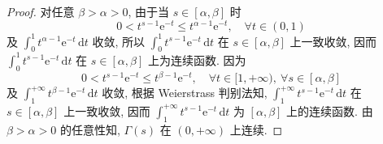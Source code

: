 \begin{proof}
对任意 $\beta>\alpha>0$, 由于当 $s\in[\alpha,\beta]$ 时
\[
  0<t^{s-1}\mathrm{e}^{-t}\leqslant t^{\alpha-1}\mathrm{e}^{-t},\quad\forall t\in(0,1)
\]
及 $\displaystyle\int_{0}^{1}t^{\alpha-1}\mathrm{e}^{-t}\,\mathrm{d}t$ 收敛, 所以 $\displaystyle\int_{0}^{1}t^{s-1}\mathrm{e}^{-t}\,\mathrm{d}t$ 在 $s\in[\alpha,\beta]$ 上一致收敛, 因而 $\displaystyle\int_{0}^{1}t^{s-1}\mathrm{e}^{-t}\,\mathrm{d}t$ 在 $s\in[\alpha,\beta]$ 上为连续函数. 因为
\[
  0<t^{s-1}\mathrm{e}^{-t}\leqslant t^{\beta-1}\mathrm{e}^{-t},\quad\forall t\in[1,+\infty),\ \forall s\in[\alpha,\beta]
\]
及 $\displaystyle\int_{1}^{+\infty}t^{\beta-1}\mathrm{e}^{-t}\,\mathrm{d}t$ 收敛, 根据 Weierstrass 判别法知, $\displaystyle\int_{1}^{+\infty}t^{s-1}\mathrm{e}^{-t}\,\mathrm{d}t$ 在 $s\in[\alpha,\beta]$ 上一致收敛, 因而 $\displaystyle\int_{1}^{+\infty}t^{s-1}\mathrm{e}^{-t}\,\mathrm{d}t$ 为 $[\alpha,\beta]$ 上的连续函数. 由 $\beta>\alpha>0$ 的任意性知, $\Gamma(s)$ 在 $(0,+\infty)$ 上连续.


\end{proof}
